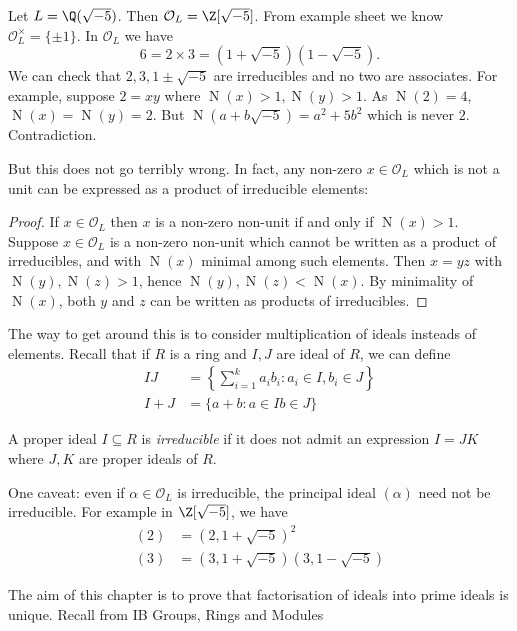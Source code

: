 \documentclass[a4paper]{article}
\renewcommand*{\O}{\mathcal{O}}
\DeclareMathOperator{\n}{N}
\begin{document}
\begin{eg}
  Let \(L = \Q(\sqrt{-5})\). Then \(\O_L = \Z[\sqrt{-5}]\). From example sheet we know \(\O_L^\times = \{\pm 1\}\). In \(\O_L\) we have
  \[
    6 = 2 \times 3 = (1 + \sqrt{-5})(1 - \sqrt{-5}).
  \]
  We can check that \(2, 3, 1 \pm \sqrt{-5}\) are irreducibles and no two are associates. For example, suppose \(2 = xy\) where \(\n(x) > 1, \n(y) > 1\). As \(\n(2) = 4\), \(\n(x) = \n(y) = 2\). But \(\n(a + b\sqrt{-5}) = a^2 + 5b^2\) which is never \(2\). Contradiction.
\end{eg}

But this does not go terribly wrong. In fact, any non-zero \(x \in \O_L\) which is not a unit can be expressed as a product of irreducible elements:

\begin{proof}
  If \(x \in \O_L\) then \(x\) is a non-zero non-unit if and only if \(\n(x) > 1\). Suppose \(x \in \O_L\) is a non-zero non-unit which cannot be written as a product of irreducibles, and with \(\n(x)\) minimal among such elements. Then \(x = yz\) with \(\n(y), \n(z) > 1\), hence \(\n(y), \n(z) < \n(x)\). By minimality of \(\n(x)\), both \(y\) and \(z\) can be written as products of irreducibles.
\end{proof}

The way to get around this is to consider multiplication of ideals insteads of elements. Recall that if \(R\) is a ring and \(I, J\) are ideal of \(R\), we can define
\begin{align*}
  IJ &= \left\{ \sum_{i = 1}^k a_ib_i: a_i \in I, b_i \in J \right\} \\
  I + J &= \{ a + b: a \in I b \in J \}
\end{align*}

\begin{definition}
  A proper ideal \(I \subseteq R\) is \emph{irreducible} if it does not admit an expression \(I = JK\) where \(J, K\) are proper ideals of \(R\).
\end{definition}

One caveat: even if \(\alpha \in \O_L\) is irreducible, the principal ideal \((\alpha)\) need not be irreducible. For example in \(\Z[\sqrt{-5}]\), we have
\begin{align*}
  (2) &= (2, 1 + \sqrt{-5})^2 \\
  (3) &= (3, 1 + \sqrt{-5})(3, 1 - \sqrt{-5})
\end{align*}

The aim of this chapter is to prove that factorisation of ideals into prime ideals is unique. Recall from IB Groups, Rings and Modules
\end{document}
